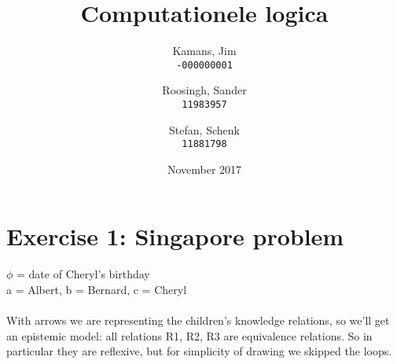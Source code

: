 \documentclass{article}
\title{Computationele logica}
\author{
    Kamans, Jim\\
    \texttt{-000000001}
    \and
    Roosingh, Sander\\
    \texttt{11983957}
    \and
    Stefan, Schenk\\
    \texttt{11881798}
}
\date{November 2017}
\begin{document}
\maketitle

\section{Exercise 1: Singapore problem}

$\phi$ = date of Cheryl's birthday \\
a = Albert, b = Bernard, c = Cheryl \\
\\
With arrows we are representing the children’s knowledge relations, so we’ll get an epistemic model: all relations R1, R2, R3 are equivalence relations. So in particular they are reflexive, but for simplicity of drawing we skipped the loops.
\\
\end{document}
